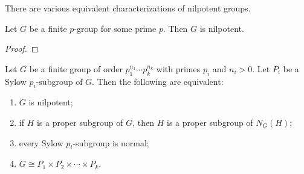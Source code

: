 \begin{remark}
    There are various equivalent characterizations of nilpotent groups.
\end{remark}
\begin{lem}
    Let $G$ be a finite $p$-group for some prime $p$. Then $G$ is nilpotent.
\end{lem}
\begin{proof}

\end{proof}





\begin{thm}
    Let $G$ be a finite group of order $p_1^{n_1} \cdots p_k^{n_k}$ with primes $p_i$ and $n_i >0$. Let $P_i$ be a Sylow $p_i$-subgroup of $G$. Then the following are equivalent:
    \begin{enumerate}
        \item $G$ is nilpotent;
        \item if $H$ is a proper subgroup of $G$, then $H$ is a proper subgroup of $N_G(H)$;
        \item every Sylow $p_i$-subgroup is normal;
        \item $G \cong P_1 \times P_2 \times \cdots \times P_k$.
    \end{enumerate}
\end{thm}

